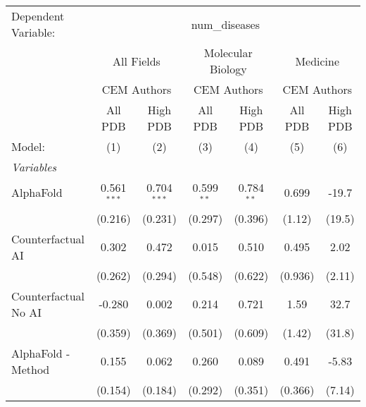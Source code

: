 \begingroup
\centering
\begin{tabular}{lcccccc}
   \tabularnewline \midrule \midrule
   Dependent Variable: & \multicolumn{6}{c}{num\_diseases}\\
 & \multicolumn{2}{c}{All Fields} & \multicolumn{2}{c}{Molecular Biology} & \multicolumn{2}{c}{Medicine} \\
\cmidrule(lr){2-3} \cmidrule(lr){4-5} \cmidrule(lr){6-7}
 & \multicolumn{2}{c}{CEM Authors} & \multicolumn{2}{c}{CEM Authors} & \multicolumn{2}{c}{CEM Authors} \\
\cmidrule(lr){2-3} \cmidrule(lr){4-5} \cmidrule(lr){6-7}
 & \multicolumn{1}{c}{All PDB} & \multicolumn{1}{c}{High PDB} & \multicolumn{1}{c}{All PDB} & \multicolumn{1}{c}{High PDB} & \multicolumn{1}{c}{All PDB} & \multicolumn{1}{c}{High PDB} \\
\cmidrule(lr){2-2} \cmidrule(lr){3-3} \cmidrule(lr){4-4} \cmidrule(lr){5-5} \cmidrule(lr){6-6} \cmidrule(lr){7-7}
   Model:                                                     & (1)           & (2)           & (3)          & (4)           & (5)          & (6)\\  
   \midrule
   \emph{Variables}\\
   AlphaFold                                                  & 0.561$^{***}$ & 0.704$^{***}$ & 0.599$^{**}$ & 0.784$^{**}$  & 0.699        & -19.7\\   
                                                              & (0.216)       & (0.231)       & (0.297)      & (0.396)       & (1.12)       & (19.5)\\   
   Counterfactual AI                                          & 0.302         & 0.472         & 0.015        & 0.510         & 0.495        & 2.02\\   
                                                              & (0.262)       & (0.294)       & (0.548)      & (0.622)       & (0.936)      & (2.11)\\   
   Counterfactual No AI                                       & -0.280        & 0.002         & 0.214        & 0.721         & 1.59         & 32.7\\   
                                                              & (0.359)       & (0.369)       & (0.501)      & (0.609)       & (1.42)       & (31.8)\\   
   AlphaFold - Method                                         & 0.155         & 0.062         & 0.260        & 0.089         & 0.491        & -5.83\\   
                                                              & (0.154)       & (0.184)       & (0.292)      & (0.351)       & (0.366)      & (7.14)\\   

\end{tabular}
